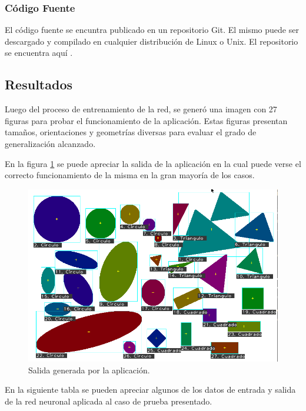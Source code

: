 \documentclass[pdftex,a4paper,10.5pt]{article}
\begin{document}
\subsubsection{C\'odigo Fuente}
	El c\'odigo fuente se encuntra publicado en un repositorio Git. El mismo puede
	ser descargado y compilado en cualquier distribuci\'on de Linux o Unix. El
	repositorio se encuentra aqu\'i \cite{repo}.

\subsection{Resultados} %

Luego del proceso de entrenamiento de la red, se gener\'o una imagen con 27 figuras para probar el funcionamiento de la aplicaci\'on. Estas figuras presentan tama\~nos, orientaciones y geometr\'ias diversas para evaluar el grado de generalizaci\'on alcanzado.

En la figura \ref{salida_ejemlpo} se puede apreciar la salida de la aplicaci\'on en la cual puede verse el correcto funcionamiento de la misma en la gran mayor\'ia de los casos.

 	           \begin{figure}[H]

	                  \begin{center}
	                    \includegraphics[width=12cm]{salida.png}
	                    \caption{\label{salida_ejemlpo} Salida generada por la aplicaci\'on. }
	                  \end{center}
	            \end{figure}


En la siguiente tabla se pueden apreciar algunos de los datos de entrada y salida de la red neuronal aplicada al caso de prueba presentado.
\end{document}
